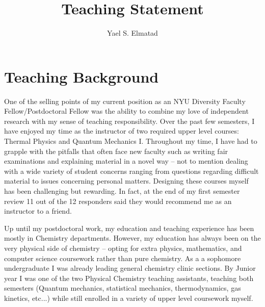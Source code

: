 \documentclass[11pt]{article}
\title{{Teaching Statement}}
\author{Yael S. Elmatad}
\date{}                                           %
\begin{document}
\maketitle
%

\section{Teaching Background}

One of the selling points of my current position as an NYU Diversity Faculty Fellow/Postdoctoral Fellow was the ability to combine my love of independent research with my sense of teaching responsibility.  Over the past few semesters, I have enjoyed my time as the instructor of two required upper level courses: Thermal Physics and Quantum Mechanics I.  Throughout my time, I have had to grapple with the pitfalls that often face new faculty such as writing fair examinations and explaining material in a novel way -- not to mention dealing with a wide variety of student concerns ranging from questions regarding difficult material to issues concerning personal matters.  Designing these courses myself has been challenging but rewarding.  In fact, at the end of my first semester review 11 out of the 12 responders said they would recommend me as an instructor to a friend. 

Up until my postdoctoral work, my education and teaching experience has been mostly in Chemistry departments.  However, my education has always been on the very physical side of chemistry -- opting for extra physics, mathematics, and computer science coursework rather than pure chemistry.  As a a sophomore undergraduate I was already leading general chemistry clinic sections.  By Junior year I was one of the two Physical Chemistry teaching assistants, teaching both semesters (Quantum mechanics, statistical mechanics, thermodynamics, gas kinetics, etc...) while still enrolled in a variety of upper level coursework myself.
\end{document}
